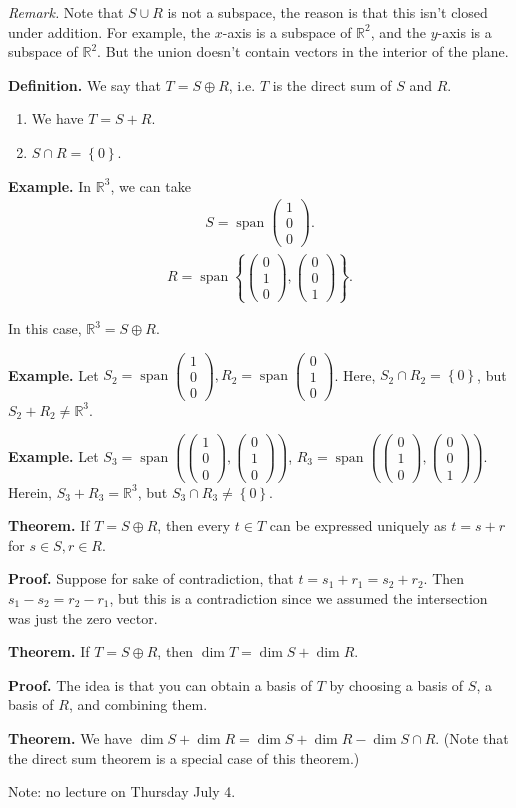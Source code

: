 \documentclass{article}
\newcommand{\mat}[1]{\begin{pmatrix}#1\end{pmatrix}}
\newcommand{\RR}{\mathbb{R}}
\DeclareMathOperator{\Span}{span}
\begin{document}
{\it Remark.} Note that $S \cup R$ is not a subspace, the reason is that this isn't closed under addition.  For example, the $x$-axis is a subspace of $\mathbb{R}^2$, and the $y$-axis is a subspace of $\RR^2$.  But the union doesn't contain vectors in the interior of the plane.

{\bf Definition.} We say that $T = S \oplus R$, i.e. $T$ is the direct sum of $S$ and $R$.

\begin{enumerate}
  \item We have $T = S+R$.
  \item $S \cap R = \left\{ 0 \right\}$.
\end{enumerate}

{\bf Example.} In $\mathbb{R}^3$, we can take
\begin{align*}
  S = \Span \mat{1 \\ 0 \\ 0}.
\end{align*}
\begin{align*}
  R = \Span \left\{ \mat{0 \\ 1 \\ 0}, \mat{0 \\ 0 \\ 1} \right\}.
\end{align*}

In this case, $\mathbb{R}^3 = S \oplus R$.

{\bf Example.} Let $S_2 = \Span \mat{ 1 \\ 0 \\ 0}, R_2 = \Span \mat{ 0 \\ 1 \\ 0}$.  Here, $S_2 \cap R_2 = \left\{ 0 \right\}$, but $S_2 + R_2 \neq \mathbb{R}^3$.

{\bf Example.} Let $S_3 = \Span \left( \mat{1 \\ 0 \\ 0}, \mat{0 \\ 1 \\ 0} \right)$, $R_3 = \Span \left( \mat{0 \\ 1 \\ 0}, \mat{0 \\ 0 \\ 1} \right)$.  Herein, $S_3 + R_3 = \mathbb{R}^3$, but $S_3 \cap R_3 \neq \left\{ 0 \right\}$.

{\bf Theorem.} If $T = S \oplus R$, then every $t \in T$ can be expressed uniquely as $t = s+r$ for $s \in S, r \in R$.

{\bf Proof.} Suppose for sake of contradiction, that $t = s_1 + r_1 = s_2 + r_2$.  Then $s_1 - s_2 = r_2 - r_1$, but this is a contradiction since we assumed the intersection was just the zero vector.

{\bf Theorem.} If $T = S \oplus R$, then $\dim T = \dim S + \dim R$.

{\bf Proof.} The idea is that you can obtain a basis of $T$ by choosing a basis of $S$, a basis of $R$, and combining them.

{\bf Theorem.} We have $\dim S + \dim R = \dim S + \dim R - \dim S \cap R$. (Note that the direct sum theorem is a special case of this theorem.)

Note: no lecture on Thursday July 4.
\end{document}
